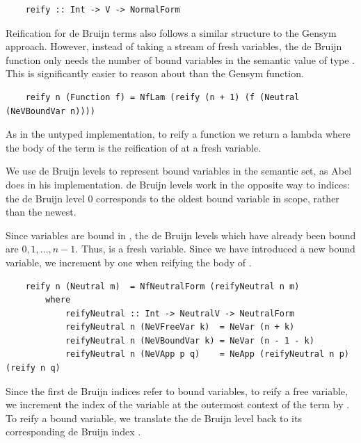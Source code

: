\begin{lstlisting}
    reify :: Int -> V -> NormalForm
\end{lstlisting}

Reification for de Bruijn terms also follows a similar structure to the Gensym approach. However, instead of taking a stream of fresh variables, the de Bruijn  function only needs the number of bound variables in the semantic value of type . This is significantly easier to reason about than the Gensym  function.

\begin{lstlisting}
    reify n (Function f) = NfLam (reify (n + 1) (f (Neutral (NeVBoundVar n))))
\end{lstlisting}

As in the untyped implementation, to reify a function  we return a lambda where the body of the term is the reification of  at a fresh variable.

We use de Bruijn levels to represent bound variables in the semantic set, as Abel does in his implementation. de Bruijn levels work in the opposite way to indices: the de Bruijn level 0 corresponds to the oldest bound variable in scope, rather than the newest. 

Since  variables are bound in , the de Bruijn levels which have already been bound are $0, 1, \dots, n - 1$. Thus,  is a fresh variable. Since we have introduced a new bound variable, we increment  by one when reifying the body of .

\begin{lstlisting}
    reify n (Neutral m)  = NfNeutralForm (reifyNeutral n m)
        where
            reifyNeutral :: Int -> NeutralV -> NeutralForm
            reifyNeutral n (NeVFreeVar k)  = NeVar (n + k)
            reifyNeutral n (NeVBoundVar k) = NeVar (n - 1 - k)
            reifyNeutral n (NeVApp p q)    = NeApp (reifyNeutral n p) (reify n q)
\end{lstlisting}

Since the first  de Bruijn indices refer to bound variables, to reify a free variable, we increment the index of the variable at the outermost context of the term  by .
To reify a bound variable, we translate the de Bruijn level  back to its corresponding de Bruijn index .

\vspace{\baselineskip}

